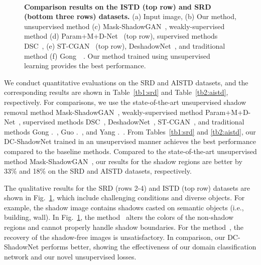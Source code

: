 \documentclass[10pt,twocolumn,letterpaper]{article}
\begin{document}
\begin{figure}[t]
	\hfill\\
	\vspace{-0.01in}
	\caption{\textbf{Comparison results on the ISTD (top row) and SRD (bottom three rows) datasets.} (a) Input image, (b) Our method, unsupervised
	method (c) Mask-ShadowGAN~\cite{Hu19}, weakly-supervised method (d) Param+M+D-Net~\cite{le2020shadow} (top row), supervised methods DSC~\cite{Hu18}, (e) ST-CGAN~\cite{Wang18} (top row), DeshadowNet~\cite{Qu17}, and traditional method (f) Gong~\etal~\cite{Gong14}. Our method trained using unsupervised learning provides the best performance.}
	\vspace{-0.1in}
	\label{fig:SRD}
\end{figure}

\vspace{0.2cm}
We conduct quantitative evaluations on the SRD and AISTD datasets, and the corresponding results are shown in Table~\ref{tb1:srd} and Table~\ref{tb2:aistd}, respectively.
For comparisons, we use the state-of-the-art unsupervised shadow removal method Mask-ShadowGAN~\cite{Hu19}, weakly-supervised method Param+M+D-Net~\cite{le2020shadow}, supervised methods DSC~\cite{Hu18}, DeshadowNet~\cite{Qu17}, ST-CGAN~\cite{Wang18},
and traditional methods Gong \etal.~\cite{Gong14}, Guo \etal.~\cite{Guo12}, and Yang \etal.~\cite{Yang12}.
From Tables~\ref{tb1:srd} and \ref{tb2:aistd}, our DC-ShadowNet trained in an unsupervised manner achieves the best performance compared to the baseline methods. 
Compared to the state-of-the-art unsupervised method Mask-ShadowGAN~\cite{Hu19}, our results for the shadow regions are better by 33\% and 18\% on the SRD and AISTD datasets, respectively.


The qualitative results for the SRD (rows 2-4) and ISTD (top row) datasets are shown in Fig.~\ref{fig:SRD}, which include challenging conditions and diverse objects. For example, the shadow image contains shadows casted on semantic objects (i.e., building, wall).
In Fig.~\ref{fig:SRD}, the method~\cite{Hu19} alters the colors of the non-shadow regions and cannot properly handle shadow boundaries. For the method~\cite{Gong14}, the recovery of the shadow-free images is unsatisfactory. 
In comparison, our DC-ShadowNet performs better, showing the effectiveness of our domain classification network and our novel unsupervised losses.
\end{document}
